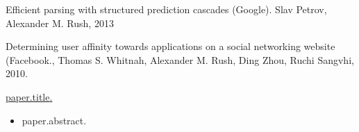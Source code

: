 \documentclass[10pt]{article}
\begin{document}
{\ind Efficient parsing with structured prediction cascades (Google). Slav Petrov, Alexander M. Rush, 2013
\medskip

\ind  Determining user affinity towards applications on a social networking website (Facebook., Thomas S. Whitnah, Alexander M. Rush, Ding Zhou, Ruchi Sangvhi, 2010.



\bigskip


\bigskip
{%
\ind \href{ paper.link } { {{paper.title}}. }
\begin{itemize}
	\item {{paper.abstract}}.
\end{itemize}
\medskip

{%












}}}
\end{document}
